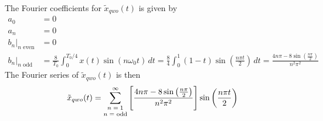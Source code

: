 \documentclass{report}
\begin{document}
\begin{solution}
\begin{center}
{}
    \end{center}
    The Fourier coefficients for $\tilde{x}_{qwo}(t)$ is given by
    \begin{align*}
        a_0 &= 0 \\
        a_n &= 0 \\
        b_n\big|_{n \text{ even}} &= 0 \\
        b_n\big|_{n \text{ odd}} &= \frac{8}{T_0}\int_{0}^{T_0/4} x(t)\sin(n\omega_0 t) \,dt = \frac{8}{4}\int_{0}^{1} (1-t)\sin\left(\frac{n\pi t}{2}\right) \,dt = \frac{4n\pi - 8\sin\left(\frac{n\pi}{2}\right)}{n^2 \pi^2}
    \end{align*}
    The Fourier series of $\tilde{x}_{qwo}(t)$ is then 
    \begin{align*}
        \tilde{x}_{qwo}(t) = \sum_{\shortstack{\scriptsize $n=1$ \\ \scriptsize $n=$ \text{odd}}}^{\infty}\left[\frac{4n\pi - 8\sin\left(\frac{n\pi}{2}\right)}{n^2 \pi^2}\right]\sin\left(\frac{n\pi t}{2}\right)
    \end{align*}
\end{solution}
\end{document}
